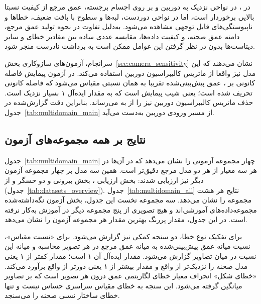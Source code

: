 در ، در نواحی نزدیک به دوربین و بر روی اجسام برجسته، عمق مرجع از کیفیت نسبتا بالایی برخوردار است، اما در نواحی دوردست، لبه‌ها و سطوح با بافت ضعیف، خطاها و ناپیوستگی‌های قابل توجهی مشاهده می‌شود. به‌دلیل تفاوت در نحوه تولید عمق مرجع، دامنه عمق صحنه، و کیفیت داده‌ها، مقایسه عددی ساده بین مقادیر خطای  و سایر دیتاست‌ها بدون در نظر گرفتن این عوامل ممکن است به برداشت نادرست منجر شود.

سرانجام، آزمون‌های سازوکاری بخش~\ref{sec:camera_sensitivity} نشان می‌دهند که این مدل نیز واقعا از ماتریس کالیبراسیون دوربین استفاده می‌کند. در آزمون پیمایش فاصله کانونی بر ، عمق پیش‌بینی‌شده تقریبا به همان نسبتی مقیاس می‌شود که فاصله کانونی تحریف شده است؛ یعنی شیب پیمایش  است که به مقدار ایده‌آل ۱ بسیار نزدیک است. حذف ماتریس کالیبراسیون دوربین نیز  را از  به  می‌رساند. بنابراین دقت گزارش‌شده در جدول~\ref{tab:multidomain_main} از مسیر ورودی دوربین به‌دست می‌آید.

\subsection[نتایج بر همه مجموعه‌های آزمون]{نتایج بر همه مجموعه‌های آزمون}
\label{subsec:md_all_sets}

جدول~\ref{tab:multidomain_main} چهار مجموعه آزمونی را نشان می‌دهد که \proposedmodel{} در آن‌ها در هر سه معیار از هر دو مدل مرجع دقیق‌تر است. همین سه مدل بر چهار مجموعه آزمون دیگر نیز ارزیابی شدند: بخش ارزیابی ، بخش بیرونی  و دو حسگر  و  از  (جدول~\ref{tab:datasets_overview}). جدول~\ref{tab:multidomain_all} نتایج هر هشت مجموعه را نشان می‌دهد. سه مجموعه نخست این جدول، بخش آزمون نگه‌داشته‌شده مجموعه‌داده‌های آموزشی‌اند و هیچ تصویری از پنج مجموعه دیگر در آموزش به‌کار نرفته است. در این جدول، مقدار پررنگ بهترین مقدار هر مجموعه آزمون را نشان می‌دهد.

برای تفکیک نوع خطا، دو سنجه کمکی نیز گزارش می‌شود. برای «نسبت مقیاس»، نسبت میانه عمق پیش‌بینی‌شده به میانه عمق مرجع در هر تصویر محاسبه و میانه این نسبت در میان تصاویر گزارش می‌شود. مقدار ایده‌آل آن ۱ است؛ مقدار کمتر از ۱ یعنی مدل صحنه را نزدیک‌تر از واقع و مقدار بیشتر از ۱ یعنی دورتر از واقع برآورد می‌کند. «خطای شکل» انحراف معیار خطای لگاریتمی عمق درون هر تصویر است که بر تصاویر میانگین گرفته می‌شود. این سنجه به خطای مقیاس سراسری حساس نیست و تنها خطای ساختار نسبی صحنه را می‌سنجد.

